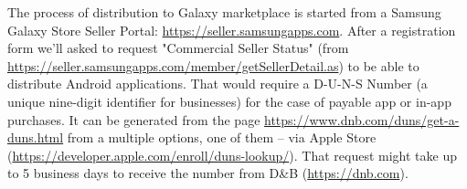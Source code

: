 The process of distribution to Galaxy marketplace is started from a Samsung Galaxy Store Seller Portal:
\href{https://seller.samsungapps.com}{https://seller.samsungapps.com}.
After a registration form we'll asked to request "Commercial Seller Status" (from 
\href{https://seller.samsungapps.com/member/getSellerDetail.as}{https://seller.samsungapps.com/member/getSellerDetail.as})
to be able to distribute Android applications. That would require a D-U-N-S Number (a unique nine-digit identifier for 
businesses) for the case of payable app or in-app purchases. It can be generated from the page 
\href{https://www.dnb.com/duns/get-a-duns.html}{ https://www.dnb.com/duns/get-a-duns.html}
from a multiple options, one of them -- via Apple Store 
(\href{https://developer.apple.com/enroll/duns-lookup/}{https://developer.apple.com/enroll/duns-lookup/}).
That request might take up to 5 business days to receive the number from D\&B (\href{https://dnb.com}{https://dnb.com}). 

